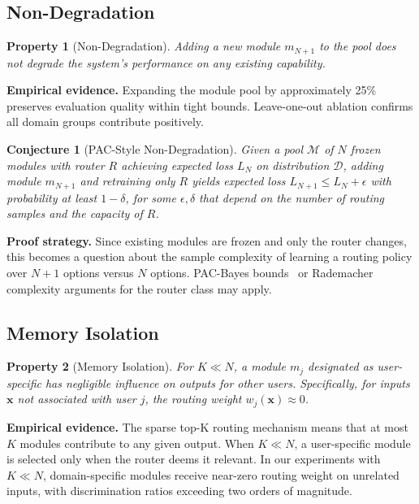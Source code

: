 \documentclass[11pt,a4paper]{article}
\newtheorem{property}{Property}
\newtheorem{conjecture}{Conjecture}
\begin{document}
\subsection{Non-Degradation}
\label{sec:nondeg}

\begin{property}[Non-Degradation]
Adding a new module $m_{N+1}$ to the pool does not degrade the system's performance on any existing capability.
\end{property}

\noindent\textbf{Empirical evidence.} Expanding the module pool by approximately 25\% preserves evaluation quality within tight bounds. Leave-one-out ablation confirms all domain groups contribute positively.

\begin{conjecture}[PAC-Style Non-Degradation]
Given a pool $\mathcal{M}$ of $N$ frozen modules with router $R$ achieving expected loss $L_N$ on distribution $\mathcal{D}$, adding module $m_{N+1}$ and retraining only $R$ yields expected loss $L_{N+1} \leq L_N + \epsilon$ with probability at least $1 - \delta$, for some $\epsilon, \delta$ that depend on the number of routing samples and the capacity of $R$.
\end{conjecture}

\noindent\textbf{Proof strategy.} Since existing modules are frozen and only the router changes, this becomes a question about the sample complexity of learning a routing policy over $N+1$ options versus $N$ options. PAC-Bayes bounds~\cite{mcallester1999pac} or Rademacher complexity arguments for the router class may apply.

\subsection{Memory Isolation}
\label{sec:isolation}

\begin{property}[Memory Isolation]
For $K \ll N$, a module $m_j$ designated as user-specific has negligible influence on outputs for other users. Specifically, for inputs $\mathbf{x}$ not associated with user $j$, the routing weight $w_j(\mathbf{x}) \approx 0$.
\end{property}

\noindent\textbf{Empirical evidence.} The sparse top-K routing mechanism means that at most $K$ modules contribute to any given output. When $K \ll N$, a user-specific module is selected only when the router deems it relevant. In our experiments with $K \ll N$, domain-specific modules receive near-zero routing weight on unrelated inputs, with discrimination ratios exceeding two orders of magnitude.
\end{document}
